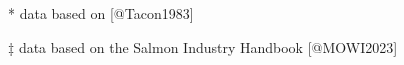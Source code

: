 \begin{sidewaystable}
\begin{threeparttable}
\begin{tabularx}{\textwidth}{XXXXXXXXXXXXXXXXX}
\bottomrule

    \end{tabularx}
    \begin{tablenotes}
      \item[*] data based on [@Tacon1983]
      \item[‡] data based on the Salmon Industry Handbook [@MOWI2023]
    \end{tablenotes}
  \end{threeparttable}
\end{sidewaystable}